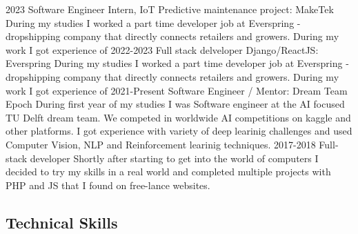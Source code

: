 \documentclass{article}
\begin{document}
\cvitem
{2023}
{Software Engineer Intern, \newline IoT Predictive maintenance project:}
{ MakeTek}
{During my studies I worked a part time developer job at Everspring - dropshipping company that directly connects retailers and growers. During my work I got experience of}
\cvitem
{2022-2023}
{Full stack delveloper Django/ReactJS:}
{ Everspring}
{During my studies I worked a part time developer job at Everspring - dropshipping company that directly connects retailers and growers. During my work I got experience of}
\cvitem
{2021-Present}
{Software Engineer / Mentor:}
{ Dream Team Epoch}
{During first year of my studies I was Software engineer at the AI focused TU Delft dream team. We competed in worldwide AI competitions on kaggle and other platforms. I got experience with variety of deep learinig challenges and used Computer Vision, NLP and Reinforcement learinig techniques.}
\cvitem
{2017-2018}
{Full-stack developer}
{}
{Shortly after starting to get into the world of computers I decided to try my skills in a real world and completed multiple projects with PHP and JS that I found on free-lance websites.}

\subsection{Technical Skills}
\end{document}
